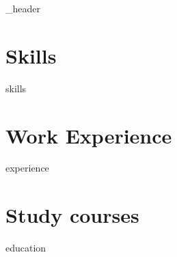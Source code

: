 \documentclass[line, letter,10pt]{article}
\author{Ilya Kazakov}
\begin{document}
{_header}
\vspace*{1pt}

\hline
\vspace*{10pt}
\section{Skills}

\vspace*{3pt}
{skills}
\vspace*{10pt}

\section{Work Experience}
\vspace*{3pt}
{experience}
\vspace*{10pt}

\section{Study courses}
{education}
\vspace*{10pt}
\end{document}
